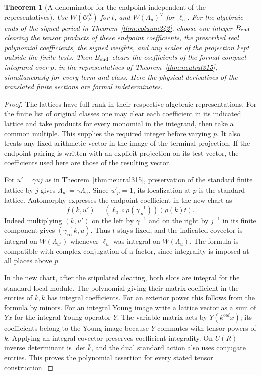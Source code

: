 \documentclass[a4paper,11pt]{article}
\newtheorem{theorem}[proposition]{Theorem}
\theoremstyle{definition}
\theoremstyle{remark}
\numberwithin{equation}{section}
\newcommand{\OO}{\mathcal O}
\begin{document}
\begin{theorem}[A denominator for the endpoint independent of the representatives]\leavevmode
\label{thm:endpoint315}
Use \(W(\OO_E^R)\) for \(t\), and \(W(\Lambda_u)^\vee\) for
\(\ell_u\). For the algebraic ends of the signed period in
Theorem~\ref{thm:column242}, choose one integer \(B_{\rm end}\)
clearing the tensor products of these endpoint coefficients,
the prescribed real polynomial coefficients, the signed weights,
and any scalar of the projection kept outside the finite tests.
Then \(B_{\rm end}\) clears the coefficients of the formal
compact integrand over \(p\), in the representatives of
Theorem~\ref{thm:neutral315}, simultaneously for every term
and class. Here the physical derivatives of the translated finite
sections are formal indeterminates.
\end{theorem}
\begin{proof}
The lattices have full rank in their respective algebraic
representations. For the finite list of original classes one
may clear each coefficient in its indicated lattice and take
products for every monomial in the integrand, then take a common
multiple. This supplies the required integer before varying \(p\).
It also treats any fixed arithmetic vector in the image of the
terminal projection. If the endpoint pairing is written with an
explicit projection on its test vector, the coefficients used
here are those of the resulting vector.

For \(u'=\gamma u j\) as in Theorem~\ref{thm:neutral315},
preservation of the standard finite lattice by \(j\) gives
\(\Lambda_{u'}=\gamma\Lambda_u\). Since \(u'_p=1\), its
localization at \(p\) is the standard lattice. Automorphy
expresses the endpoint coefficient in the new chart as
\[
      f(k,u')=(\ell_u\circ\rho(\gamma_\infty^{-1}))(\rho(k)t).
\]
Indeed multiplying \((k,u')\) on the left by \(\gamma^{-1}\)
and on the right by \(j^{-1}\) in its finite component gives
\((\gamma_\infty^{-1}k,u)\). Thus \(t\) stays fixed, and
the indicated covector is integral on \(W(\Lambda_{u'})\)
whenever \(\ell_u\) was integral on \(W(\Lambda_u)\).
The formula is compatible with complex conjugation of a factor,
since integrality is imposed at all places above \(p\).

In the new chart, after the stipulated clearing, both slots are
integral for the standard local module. The polynomial giving
their matrix coefficient in the entries of \(k,\bar k\) has
integral coefficients. For an exterior power this follows from
the formula by minors. For an integral Young image write a
lattice vector as a sum of \(Yx\) for the integral Young
operator \(Y\). The variable matrix acts by
\(Y(k^{\otimes d}x)\); its coefficients belong to the Young
image because \(Y\) commutes with tensor powers of \(k\).
Applying an integral covector preserves coefficient integrality.
On \(U(R)\) inverse determinant is \(\det\bar k\), and the
dual standard action also uses conjugate entries. This proves
the polynomial assertion for every stated tensor construction.


\end{proof}
\end{document}
